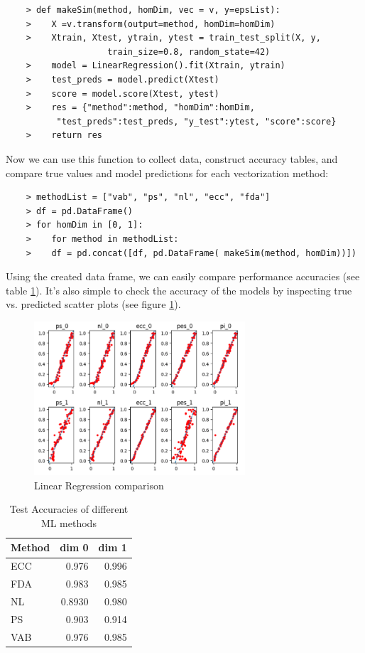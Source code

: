 \documentclass[conference, onecolumn]{IEEEtran}
\begin{document}
\begin{verbatim}
    > def makeSim(method, homDim, vec = v, y=epsList):
    >    X =v.transform(output=method, homDim=homDim)
    >    Xtrain, Xtest, ytrain, ytest = train_test_split(X, y, 
                    train_size=0.8, random_state=42)
    >    model = LinearRegression().fit(Xtrain, ytrain)
    >    test_preds = model.predict(Xtest)
    >    score = model.score(Xtest, ytest)
    >    res = {"method":method, "homDim":homDim, 
          "test_preds":test_preds, "y_test":ytest, "score":score}
    >    return res
\end{verbatim}
Now we can use this function to collect data, construct accuracy tables, and compare true values and model predictions for each vectorization method:


\begin{verbatim}
    > methodList = ["vab", "ps", "nl", "ecc", "fda"]
    > df = pd.DataFrame()
    > for homDim in [0, 1]:
    >    for method in methodList:
    >    df = pd.concat([df, pd.DataFrame( makeSim(method, homDim))])
\end{verbatim}
Using the created data frame, we can easily compare performance accuracies (see table \ref{tab:acc}). It's also simple to check the accuracy of the models by inspecting true vs. predicted scatter plots (see figure \ref{fig:LR_comparison}).

\begin{figure}
  \centering
  \includegraphics[width = 0.7\textwidth]{LR_comparison.png}%
  \caption{Linear Regression comparison}
  \label{fig:LR_comparison}
\end{figure}



\begin{table}[htbp]
  \centering
  \begin{tabular}{lrr}
   \hline
   Method & dim 0 & dim 1 \\
   \hline
   ECC & 0.976 & 0.996 \\
   FDA & 0.983 & 0.985 \\
   NL & 0.8930 & 0.980 \\
   PS & 0.903 & 0.914 \\
   VAB & 0.976 & 0.985 \\
   \hline
  \end{tabular}
  \caption{Test Accuracies of different ML methods}
  \label{tab:acc}
\end{table}
\end{document}
